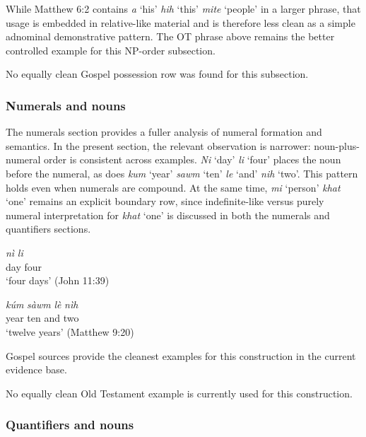 \documentclass[
  11pt,
  a4paper,
]{article}
\newcommand{\tdim}[1]{\textit{#1}}
\newcommand{\tdimword}[1]{\textit{#1}}
\newcommand{\glossquote}[1]{`#1'}
\begin{document}
While Matthew 6:2 contains \tdim{a} \glossquote{his} \tdim{hih}
\glossquote{this} \tdim{mite} \glossquote{people} in a larger phrase,
that usage is embedded in relative-like material and is therefore less
clean as a simple adnominal demonstrative pattern. The OT phrase above
remains the better controlled example for this NP-order subsection.

No equally clean Gospel possession row was found for this subsection.

\subsubsection{Numerals and nouns}\label{numerals-and-nouns}

The numerals section provides a fuller analysis of numeral formation and
semantics. In the present section, the relevant observation is narrower:
noun-plus-numeral order is consistent across examples. \tdim{Ni}
\glossquote{day} \tdim{li} \glossquote{four} places the noun before the
numeral, as does \tdim{kum} \glossquote{year} \tdim{sawm}
\glossquote{ten} \tdim{le} \glossquote{and} \tdim{nih} \glossquote{two}.
This pattern holds even when numerals are compound. At the same time,
\tdim{mi} \glossquote{person} \tdim{khat} \glossquote{one} remains an
explicit boundary row, since indefinite-like versus purely numeral
interpretation for \tdim{khat} \glossquote{one} is discussed in both the
numerals and quantifiers sections.

\begin{exe}
\ex \label{ex:np-ni-li}
\gll \tdimword{nì} \tdimword{li} \\
     day four \\
\glt \glossquote{four days} (John 11:39)
\end{exe}

\begin{exe}
\ex \label{ex:np-kum-sawm-le-nih}
\gll \tdimword{kúm} \tdimword{sàwm} \tdimword{lè} \tdimword{nìh} \\
     year ten and two \\
\glt \glossquote{twelve years} (Matthew 9:20)
\end{exe}

Gospel sources provide the cleanest examples for this construction in
the current evidence base.

No equally clean Old Testament example is currently used for this
construction.

\subsubsection{Quantifiers and nouns}\label{quantifiers-and-nouns}
\end{document}
